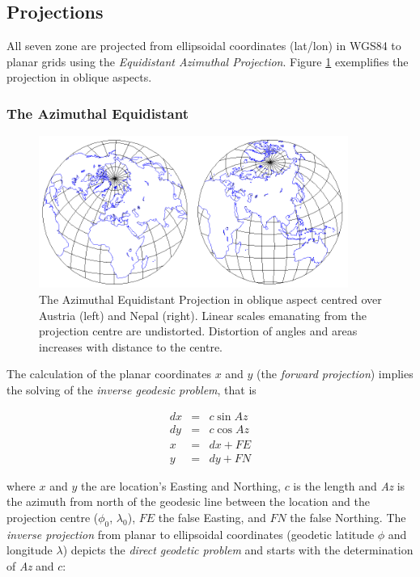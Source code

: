 \documentclass[10pt,a4paper]{article}
\begin{document}
\newpage

\subsection{Projections}
\label{sub:projections}

All seven zone are projected from ellipsoidal coordinates (lat/lon) in WGS84 to planar grids using the \textit{Equidistant Azimuthal Projection}. Figure \ref{fig:equi_azi} exemplifies the projection in oblique aspects. 

\subsubsection{The Azimuthal Equidistant}

\begin{figure}[hbtp]
\centering
\includegraphics[width=0.9\textwidth]{equi_azi}
\caption{
The Azimuthal Equidistant Projection in oblique aspect centred over Austria (left) and Nepal (right). Linear scales emanating from the projection centre are undistorted. Distortion of angles and areas increases with distance to the centre.
}
\label{fig:equi_azi}
\end{figure}

The calculation of the planar coordinates $x$ and $y$ (the \textit{forward projection}) implies the solving of the \textit{inverse geodesic problem}, that is

\begin{eqnarray}
dx &=& c \sin Az \\ 
dy &=& c \cos Az \\
x &=& dx + FE \\
y &=& dy + FN
\label{eq:inverse}
\end{eqnarray}

where $x$ and $y$ the are location's Easting and Northing, $c$ is the length and \textit{Az} is the azimuth from north of the geodesic line between the location and the projection centre ($\phi_{0}$, $\lambda_{0}$), $FE$ the false Easting, and $FN$ the false Northing. The \textit{inverse projection} from planar to ellipsoidal coordinates (geodetic latitude $\phi$ and longitude $\lambda$) depicts the \textit{direct geodetic problem} and starts with the determination of \textit{Az} and $c$:
\end{document}
